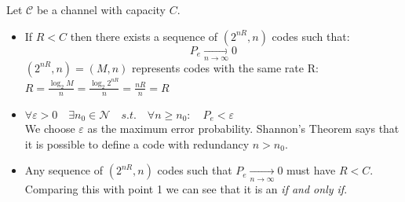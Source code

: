 \begin{thm}
	Let $\mathcal{C}$ be a channel with capacity $C$.
	\begin{itemize}
		\item If $R < C$ then there exists a sequence of $(2^{nR}, n)$ codes such that:
		$$P_e  \underset{n \rightarrow \infty}{\rightarrow} 0$$
		$(2^{nR}, n) = (M,n)$ represents codes with the same rate R: $R = \frac{\log_2 M}{n} = \frac{\log_2 2^{nR}}{n} = \frac{nR}{n} = R$ 
		
		\item $\forall \varepsilon > 0 \quad \exists n_0 \in \mathcal{N} \quad s.t. \quad \forall n \geq n_0:\quad P_e < \varepsilon$\\
		We choose $\varepsilon$ as the maximum error probability. Shannon's Theorem says that it is possible to define a code with redundancy $n > n_0$.
		
		\item Any sequence of $(2^{nR}, n)$ codes such that $P_e  \underset{n \rightarrow \infty}{\rightarrow} 0$ must have $R < C$. Comparing this with point 1 we can see that it is an \textit{if and only if}. 
	\end{itemize}
\end{thm}
